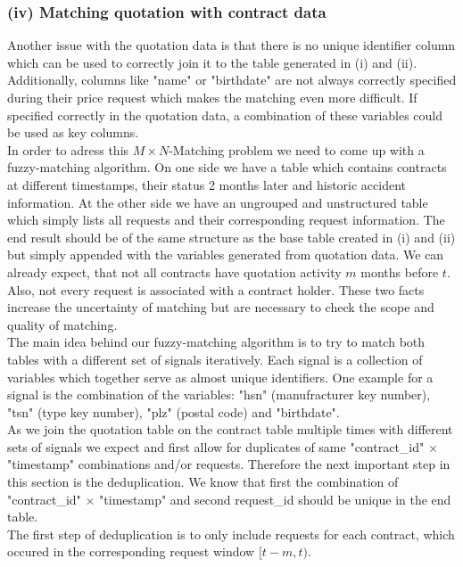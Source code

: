 \documentclass[12pt,titlepage]{article}
\begin{document}
\subsubsection*{(iv) Matching quotation with contract data}
Another issue with the quotation data is that there is no unique identifier column which can be used to correctly join it to the table generated in (i) and (ii). Additionally, columns like "name" or "birthdate" are not always correctly specified during their price request which makes the matching even more difficult. If specified correctly in the quotation data, a combination of these variables could be used as key columns. \\
In order to adress this $M\times N$-Matching problem we need to come up with a fuzzy-matching algorithm. On one side we have a table which contains contracts at different timestamps, their status 2 months later and historic accident information. At the other side we have an ungrouped and unstructured table which simply lists all requests and their corresponding request information. The end result should be of the same structure as the base table created in (i) and (ii) but simply appended with the variables generated from quotation data. We can already expect, that not all contracts have quotation activity $m$ months before $t$. Also, not every request is associated with a contract holder. These two facts increase the uncertainty of matching but are necessary to check the scope and quality of matching. \\
The main idea behind our fuzzy-matching algorithm is to try to match both tables with a different set of signals iteratively. Each signal is a collection of variables which together serve as almost unique identifiers. One example for a signal is the combination of the variables: "hsn" (manufracturer key number), "tsn" (type key number), "plz" (postal code) and "birthdate". \\
As we join the quotation table on the contract table multiple times with different sets of signals we expect and first allow for duplicates of same "contract\_id" $\times$ "timestamp" combinations and/or requests. Therefore the next important step in this section is the deduplication. We know that first the combination of "contract\_id" $\times$ "timestamp" and second request\_id should be unique in the end table. \\
The first step of deduplication is to only include requests for each contract, which occured in the corresponding request window $[t-m,t)$. \\
\end{document}
